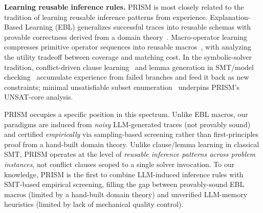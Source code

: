 \textbf{Learning reusable inference rules.} PRISM is most closely related to the tradition of learning reusable inference patterns from experience. Explanation-Based Learning (EBL) generalizes successful traces into reusable schemas with provable correctness derived from a domain theory~\citep{MitchellKellerKedarCabelli1986,DeJongMooney1986}. Macro-operator learning compresses primitive operator sequences into reusable macros~\citep{KorfMacro1985}, with \citet{Minton1990} analyzing the utility tradeoff between coverage and matching cost. In the symbolic-solver tradition, conflict-driven clause learning~\citep{MarquesSilvaSakallah1996} and lemma generation in SMT/model checking~\citep{BradleyIC3} accumulate experience from failed branches and feed it back as new constraints; minimal unsatisfiable subset enumeration~\citep{LiberatoreSchaerf} underpins PRISM's UNSAT-core analysis.

PRISM occupies a specific position in this spectrum. Unlike EBL macros, our paradigms are induced from \textit{noisy} LLM-generated traces (not provably sound) and certified \textit{empirically} via sampling-based screening rather than first-principles proof from a hand-built domain theory. Unlike clause/lemma learning in classical SMT, PRISM operates at the level of \textit{reusable inference patterns across problem instances}, not conflict clauses scoped to a single solver invocation. To our knowledge, PRISM is the first to combine LLM-induced inference rules with SMT-based empirical screening, filling the gap between provably-sound EBL macros (limited by a hand-built domain theory) and unverified LLM-memory heuristics (limited by lack of mechanical quality control).
